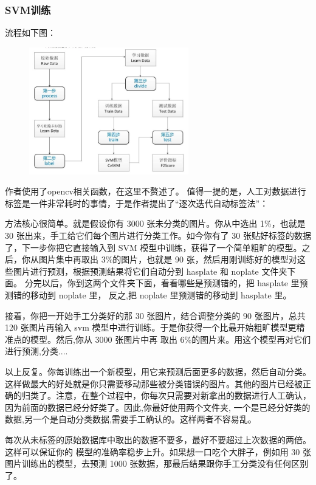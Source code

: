 \subsubsection{SVM训练}
流程如下图：
\begin{figure}[H]
    \centering 
    \includegraphics[width=0.618\textwidth]{image/2_6_5_1.jpg}    
    \label{logic}
\end{figure}
作者使用了opencv相关函数，在这里不赘述了。
值得一提的是，人工对数据进行标签是一件非常耗时的事情，于是作者提出了“逐次迭代自动标签法”：

方法核心很简单。就是假设你有 3000 张未分类的图片。你从中选出 1\%，也就是 30 张出来，手工给它们每个图片进行分类工作。如今你有了 30 张贴好标签的数据了，下一步你把它直接输入到 SVM 模型中训练，获得了一个简单粗旷的模型。之后，你从图片集中再取出 3\%的图片，也就是 90 张，然后用刚训练好的模型对这些图片进行预测，根据预测结果将它们自动分到 hasplate 和 noplate 文件夹下面。 分完以后，你到这两个文件夹下面，看看哪些是预测错的，把 hasplate 里预测错的移动到 noplate 里， 反之,把 noplate 里预测错的移动到 hasplate 里。 

接着，你把一开始手工分类好的那 30 张图片，结合调整分类的 90 张图片，总共 120 张图片再输入 svm 模型中进行训练。于是你获得一个比最开始粗旷模型更精准点的模型。然后,你从 3000 张图片中再 取出 6\%的图片来。用这个模型再对它们进行预测,分类.... 

以上反复。你每训练出一个新模型，用它来预测后面更多的数据，然后自动分类。这样做最大的好处就是你只需要移动那些被分类错误的图片。其他的图片已经被正 确的归类了。注意，在整个过程中，你每次只需要对新拿出的数据进行人工确认，因为前面的数据已经分好类了。因此,你最好使用两个文件夹, 一个是已经分好类的数据,另一个是自动分类数据,需要手工确认的。这样两者不容易乱。 

每次从未标签的原始数据库中取出的数据不要多，最好不要超过上次数据的两倍。这样可以保证你的 模型的准确率稳步上升。如果想一口吃个大胖子，例如用 30 张图片训练出的模型，去预测 1000 张数据，那最后结果跟你手工分类没有任何区别了。 
